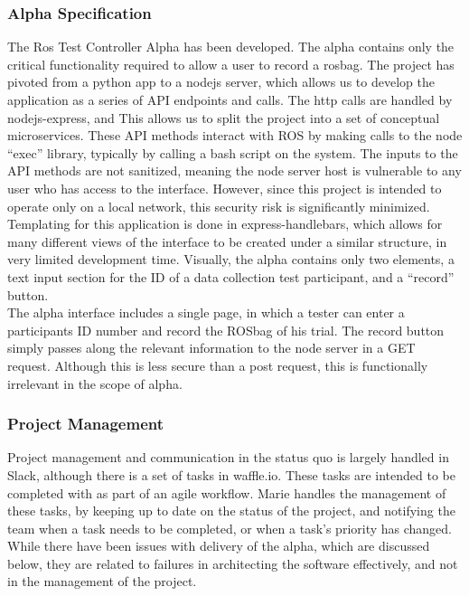 \documentclass[onecolumn, draftclsnofoot,10pt, compsoc]{IEEEtran}
\begin{document}
\subsubsection{Alpha Specification}
The Ros Test Controller Alpha has been developed. 
The alpha contains only the critical functionality required to allow a user to record a rosbag. The project has pivoted from a python app to a nodejs server, which allows us to develop the application as a series of API endpoints and calls. The http calls are handled by nodejs-express, and This allows us to split the project into a set of conceptual microservices. These API methods interact with ROS by making calls to the node “exec” library, typically by calling a bash script on the system. The inputs to the API methods are not sanitized, meaning the node server host is vulnerable to any user who has access to the interface. However, since this project is intended to operate only on a local network, this security risk is significantly minimized.\\
Templating for this application is done in express-handlebars, which allows for many different views of the interface to be created under a similar structure, in very limited development time. Visually, the alpha contains only two elements, a text input section for the ID of a data collection test participant, and a “record” button.\\
The alpha interface includes a single page, in which a tester can enter a participants ID number and record the ROSbag of his trial. The record button simply passes along the relevant information to the node server in a GET request. Although this is less secure than a post request, this is functionally irrelevant in the scope of alpha.

\subsubsection{Project Management}
Project management and communication in the status quo is largely handled in Slack, although there is a set of tasks in waffle.io. These tasks are intended to be completed with as part of an agile workflow. Marie handles the management of these tasks, by keeping up to date on the status of the project, and notifying the team when a task needs to be completed, or when a task’s priority has changed. While there have been issues with delivery of the alpha, which are discussed below, they are related to failures in architecting the software effectively, and not in the management of the project.
\end{document}

